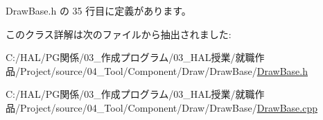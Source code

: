  Draw\+Base.\+h の 35 行目に定義があります。



このクラス詳解は次のファイルから抽出されました\+:\begin{DoxyCompactItemize}
\item 
C\+:/\+H\+A\+L/\+P\+G関係/03\+\_\+作成プログラム/03\+\_\+\+H\+A\+L授業/就職作品/\+Project/source/04\+\_\+\+Tool/\+Component/\+Draw/\+Draw\+Base/\mbox{\hyperlink{_draw_base_8h}{Draw\+Base.\+h}}\item 
C\+:/\+H\+A\+L/\+P\+G関係/03\+\_\+作成プログラム/03\+\_\+\+H\+A\+L授業/就職作品/\+Project/source/04\+\_\+\+Tool/\+Component/\+Draw/\+Draw\+Base/\mbox{\hyperlink{_draw_base_8cpp}{Draw\+Base.\+cpp}}\end{DoxyCompactItemize}
